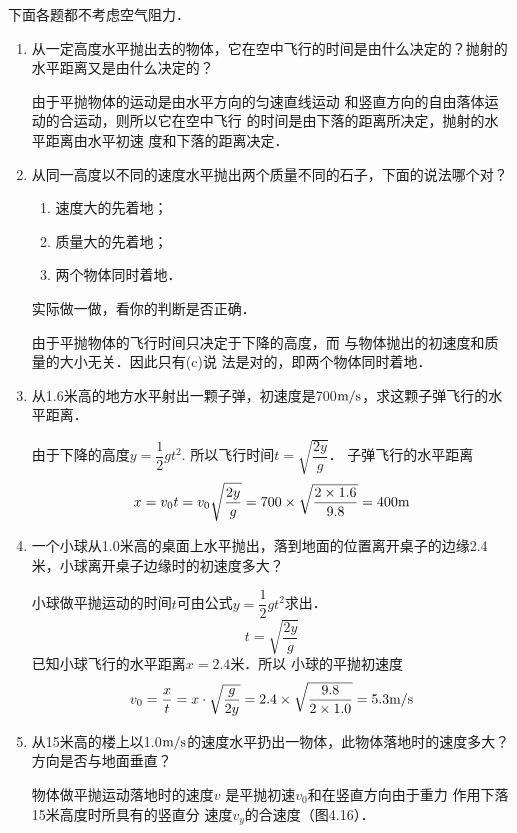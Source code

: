 下面各题都不考虑空气阻力．
\begin{enumerate}
\item 从一定高度水平抛出去的物体，它在空中飞行的时间是由什么决定的？抛射的水平距离又是由什么决定的？


\begin{solution}
    由于平抛物体的运动是由水平方向的匀速直线运动
    和竖直方向的自由落体运动的合运动，则所以它在空中飞行
    的时间是由下落的距离所决定，抛射的水平距离由水平初速
    度和下落的距离决定．
\end{solution}
\item 从同一高度以不同的速度水平抛出两个质量不同的石子，下面的说法哪个对？
\begin{enumerate}
	\item 速度大的先着地；
	\item  质量大的先着地；
	\item 两个物体同时着地．
\end{enumerate}
实际做一做，看你的判断是否正确．

\begin{solution}
    由于平抛物体的飞行时间只决定于下降的高度，而
    与物体抛出的初速度和质量的大小无关．因此只有(c)说
    法是对的，即两个物体同时着地．
\end{solution}
\item 从1.6米高的地方水平射出一颗子弹，初速度是700$\text{m}/\text{s}$，求这颗子弹飞行的水平距离．

\begin{solution}
    由于下降的高度$y=\dfrac{1}{2}gt^2$. 所以飞行时间$t=\sqrt{\dfrac{2y}{g}}$．
    子弹飞行的水平距离
\[x=v_0t=v_0\sqrt{\dfrac{2y}{g}}=700\times \sqrt{\frac{2\times 1.6}{9.8}}=400{\rm m}\]
\end{solution}
\item 一个小球从1.0米高的桌面上水平抛出，落到地面的位置离开桌子的边缘2.4米，小球离开桌子边缘时的初速度多大？

\begin{solution}
小球做平抛运动的时间$t$可由公式$y=\dfrac{1}{2}gt^2$求出．
\[t=\sqrt{\frac{2y}{g}}\]
已知小球飞行的水平距离$x=2.4$米．所以
小球的平抛初速度
\[v_0=\frac{x}{t}=x\cdot \sqrt{\frac{g}{2y}}=2.4\times \sqrt{\frac{9.8}{2\times 1.0}}=5.3\text{m}/\text{s}\]
\end{solution}
\item 从15米高的楼上以1.0$\text{m}/\text{s}$的速度水平扔出一物体，此物体落地时的速度多大？方向是否与地面垂直？

\begin{solution}
    物体做平抛运动落地时的速度$v$
    是平抛初速$v_0$和在竖直方向由于重力
    作用下落15米高度时所具有的竖直分
    速度$v_y$的合速度（图4.16）．
\begin{figure}[htp]
    \centering
{}
    \caption{}
\end{figure}    
    

\end{solution}
\end{enumerate}
